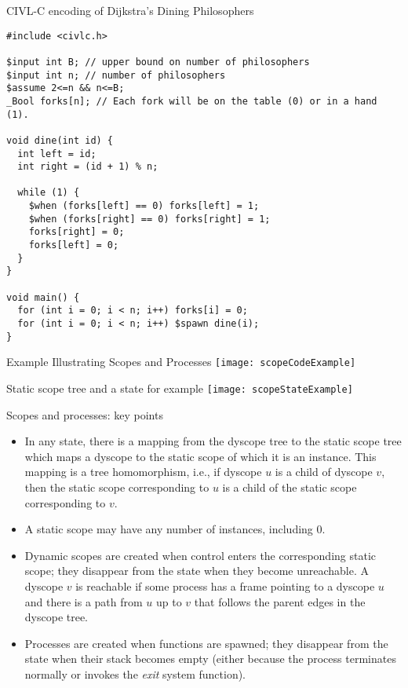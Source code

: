 \documentclass[t]{beamer}
\begin{document}
\begin{frame}[containsverbatim]{CIVL-C encoding of Dijkstra's Dining Philosophers}
  \begin{scriptsize}
\begin{verbatim}
#include <civlc.h>

$input int B; // upper bound on number of philosophers
$input int n; // number of philosophers
$assume 2<=n && n<=B;
_Bool forks[n]; // Each fork will be on the table (0) or in a hand (1). 

void dine(int id) {
  int left = id;
  int right = (id + 1) % n;

  while (1) {
    $when (forks[left] == 0) forks[left] = 1;
    $when (forks[right] == 0) forks[right] = 1;
    forks[right] = 0;
    forks[left] = 0;
  }
}

void main() {
  for (int i = 0; i < n; i++) forks[i] = 0;
  for (int i = 0; i < n; i++) $spawn dine(i);
}
\end{verbatim}
  \end{scriptsize}
\end{frame}

\begin{frame}{Example Illustrating Scopes and Processes}
  \texttt{[image: scopeCodeExample]}
\end{frame}

\begin{frame}{Static scope tree and a state for example}
  \texttt{[image: scopeStateExample]}
\end{frame}

\begin{frame}{Scopes and processes: key points}
\begin{itemize}
\item In any state, there is a mapping from the dyscope tree to the
  static scope tree which maps a dyscope to the static scope of which
  it is an instance.  This mapping is a \alert{tree homomorphism},
  i.e., if dyscope $u$ is a child of dyscope $v$, then the static
  scope corresponding to $u$ is a child of the static scope
  corresponding to $v$.
\item A static scope may have any number of instances, including 0.
\item Dynamic scopes are created when control enters the corresponding
  static scope; they disappear from the state when they become
  unreachable.  A dyscope $v$ is \alert{reachable} if some process has a
  frame pointing to a dyscope $u$ and there is a path from $u$ up to
  $v$ that follows the parent edges in the dyscope tree.
\item Processes are created when functions are spawned; they disappear
  from the state when their stack becomes empty (either because the
  process terminates normally or invokes the \alert{\emph{exit}}
  system function).
\end{itemize}
\end{frame}
\end{document}
